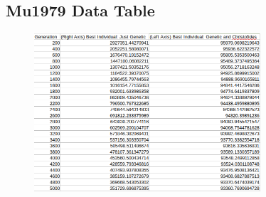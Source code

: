 \documentclass[11pt,a4paper,titlepage]{article}
\begin{document}
\begin{appendices}
\pagebreak

\subsection{Mu1979 Data Table}

\begin{figure}[ht]
	\includegraphics[width=0.75\textwidth]{mu1979Table}
	\centering
\end{figure}
\end{appendices}
\end{document}
